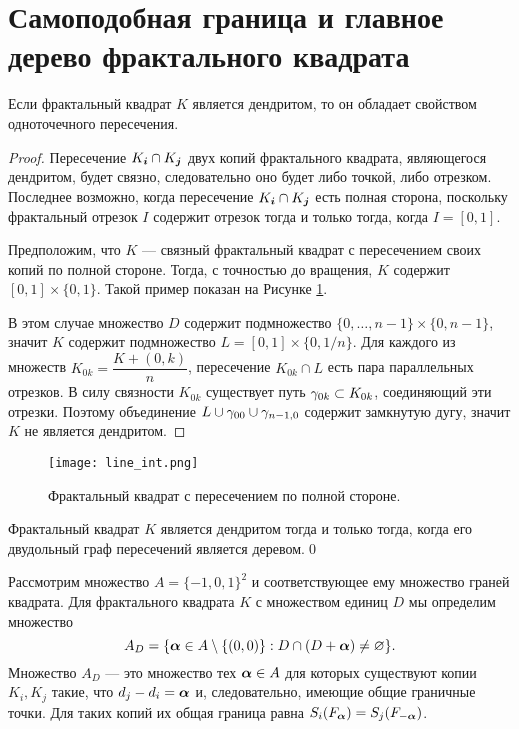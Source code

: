 \section{Самоподобная граница и главное дерево фрактального квадрата}

\begin{proposition}
\label{thm:den_necessary_sufficient}
Если фрактальный квадрат $K$ является дендритом, то он обладает свойством одноточечного пересечения.
\end{proposition}

\begin{proof}
Пересечение $K_{\bm{i}}\cap K_{\bm{j}}$ двух копий фрактального квадрата, являющегося дендритом, будет связно, следовательно оно будет либо точкой, либо отрезком.
Последнее возможно, когда пересечение $K_{\bm{i}}\cap K_{\bm{j}}$ есть полная сторона, поскольку фрактальный отрезок $I$ содержит отрезок тогда и только тогда, когда $I=[0, 1]$. 

Предположим, что $K$ --- связный фрактальный квадрат с пересечением своих копий по полной стороне. 
Тогда, с точностью до вращения, $K$ содержит $[0,1]\times\{0,1\}$.
Такой пример показан на Рисунке \ref{fig:line_int}.

В этом случае множество $D$ содержит подмножество $ \{0,\ldots,n-1\}\times \{0,n-1\}$, значит $K$ содержит подмножество $L=[0,1]\times\{0,1/n\}$. 
Для каждого из множеств $K_{0k}=\dfrac{K+(0,k)}{n}$, пересечение $K_{0k}\cap L$ есть пара параллельных отрезков. 
В силу связности $K_{0k}$ существует путь $\gamma_{0k}\subset K_{0k}$, соединяющий эти  отрезки. 
Поэтому объединение $L\cup\gamma_{00}\cup\gamma_{n-1,0}$ содержит замкнутую дугу, значит $K$ не является дендритом. 
\end{proof}

\begin{figure}[H]
 \centering
 \texttt{[image: line\_int.png]}
 \caption{Фрактальный квадрат с пересечением по полной стороне.}
 \label{fig:line_int}
\end{figure}

\begin{corollary}
Фрактальный квадрат $K$ является дендритом тогда и только тогда, когда его двудольный граф пересечений является деревом.\hfill\qed
\end{corollary}

Рассмотрим множество $A=\{-1,0,1\}^2$ и соответствующее ему множество граней квадрата. 
Для фрактального квадрата $K$ с множеством единиц $D$ мы определим множество 
$$A_D=\{{\bm{\alpha}}\in A\setminus\{(0,0)\}: D\cap(D+{\bm{\alpha}})\neq\varnothing\}.$$ 
Множество $A_D$ --- это множество тех ${\bm{\alpha}}\in A$ для которых существуют копии $K_i, K_j$ такие, что $d_j-d_i={\bm{\alpha}}$ и, следовательно, имеющие общие граничные точки. 
Для таких копий их общая граница равна $S_i(F_{\bm{\alpha}})=S_j(F_{-{\bm{\alpha}}})$. 

